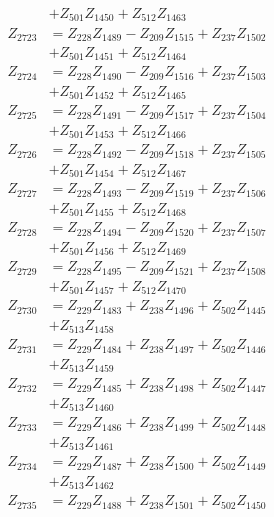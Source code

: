 \begin{multicols}{2}
\begin{align}
&+ Z_{501}Z_{1450} + Z_{512}Z_{1463} \nonumber \\
Z_{2723} &= Z_{228}Z_{1489} - Z_{209}Z_{1515} + Z_{237}Z_{1502}  \nonumber \\
&+ Z_{501}Z_{1451} + Z_{512}Z_{1464} \nonumber \\
Z_{2724} &= Z_{228}Z_{1490} - Z_{209}Z_{1516} + Z_{237}Z_{1503}  \nonumber \\
&+ Z_{501}Z_{1452} + Z_{512}Z_{1465} \nonumber \\
Z_{2725} &= Z_{228}Z_{1491} - Z_{209}Z_{1517} + Z_{237}Z_{1504}  \nonumber \\
&+ Z_{501}Z_{1453} + Z_{512}Z_{1466} \nonumber \\
Z_{2726} &= Z_{228}Z_{1492} - Z_{209}Z_{1518} + Z_{237}Z_{1505}  \nonumber \\
&+ Z_{501}Z_{1454} + Z_{512}Z_{1467} \nonumber \\
Z_{2727} &= Z_{228}Z_{1493} - Z_{209}Z_{1519} + Z_{237}Z_{1506}  \nonumber \\
&+ Z_{501}Z_{1455} + Z_{512}Z_{1468} \nonumber \\
Z_{2728} &= Z_{228}Z_{1494} - Z_{209}Z_{1520} + Z_{237}Z_{1507}  \nonumber \\
&+ Z_{501}Z_{1456} + Z_{512}Z_{1469} \nonumber \\
Z_{2729} &= Z_{228}Z_{1495} - Z_{209}Z_{1521} + Z_{237}Z_{1508}  \nonumber \\
&+ Z_{501}Z_{1457} + Z_{512}Z_{1470} \nonumber \\
Z_{2730} &= Z_{229}Z_{1483} + Z_{238}Z_{1496} + Z_{502}Z_{1445}  \nonumber \\
&+ Z_{513}Z_{1458} \nonumber \\
Z_{2731} &= Z_{229}Z_{1484} + Z_{238}Z_{1497} + Z_{502}Z_{1446}  \nonumber \\
&+ Z_{513}Z_{1459} \nonumber \\
Z_{2732} &= Z_{229}Z_{1485} + Z_{238}Z_{1498} + Z_{502}Z_{1447}  \nonumber \\
&+ Z_{513}Z_{1460} \nonumber \\
Z_{2733} &= Z_{229}Z_{1486} + Z_{238}Z_{1499} + Z_{502}Z_{1448}  \nonumber \\
&+ Z_{513}Z_{1461} \nonumber \\
Z_{2734} &= Z_{229}Z_{1487} + Z_{238}Z_{1500} + Z_{502}Z_{1449}  \nonumber \\
&+ Z_{513}Z_{1462} \nonumber \\
Z_{2735} &= Z_{229}Z_{1488} + Z_{238}Z_{1501} + Z_{502}Z_{1450}  \nonumber \\

\end{align}
\end{multicols}
